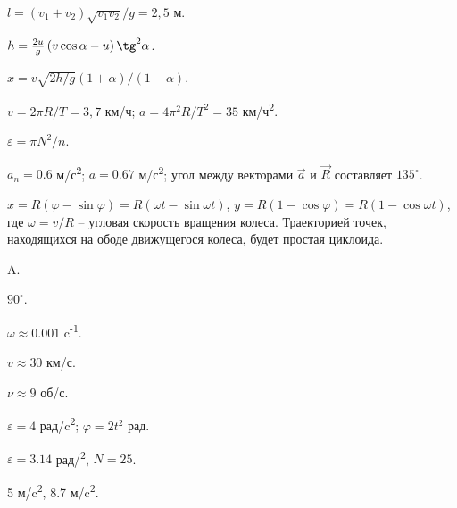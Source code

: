 \begin{Answer}{41}
$l = (v_1 + v_2)\sqrt{v_1 v_2}/g = 2,5$ м.
\end{Answer}
\begin{Answer}{42}
$h = \frac{2u}{g}\left( v \cos \alpha - u \right) \tg^2 \alpha$.
\end{Answer}
\begin{Answer}{43}
$x = v \sqrt{2h/g} \left( 1 + \alpha \right) / \left( 1 - \alpha \right)$.
\end{Answer}
\begin{Answer}{44}
$v = 2 \pi R/T = 3,7$ км/ч; $a = 4\pi^2 R/T^2 = 35$ км/ч\textsuperscript{2}.
\end{Answer}
\begin{Answer}{45}
$\varepsilon = \pi N^2/n$.
\end{Answer}
\begin{Answer}{46}
$a_n = 0.6$ м/с\textsuperscript{2}; $a = 0.67$ м/с\textsuperscript{2}; угол между векторами $\vec{a}$ и $\vec{R}$ составляет $135^{\circ}$.
\end{Answer}
\begin{Answer}{48}
$x= R(\varphi - \sin \varphi) = R(\omega t - \sin \omega t)$, $y=R(1-\cos \varphi) = R(1-\cos \omega t)$, где $\omega = v/R$ -- угловая скорость вращения колеса. Траекторией точек, находящихся на ободе движущегося колеса, будет простая циклоида.
\end{Answer}
\begin{Answer}{57}
A.
\end{Answer}
\begin{Answer}{58}
$90^{\circ}$.
\end{Answer}
\begin{Answer}{61}
$\omega \approx 0.001$ c\textsuperscript{-1}.
\end{Answer}
\begin{Answer}{62}
$v \approx 30$ км/с.
\end{Answer}
\begin{Answer}{63}
$\nu \approx 9$ об/с.
\end{Answer}
\begin{Answer}{64}
$\varepsilon = 4$ рад/c\textsuperscript{2}; $\varphi = 2t^2$ рад.
\end{Answer}
\begin{Answer}{65}
$\varepsilon =  3.14$ рад/\textsuperscript{2}, $N = 25$.
\end{Answer}
\begin{Answer}{66}
5 м/c\textsuperscript{2}, 8.7 м/c\textsuperscript{2}.
\end{Answer}
